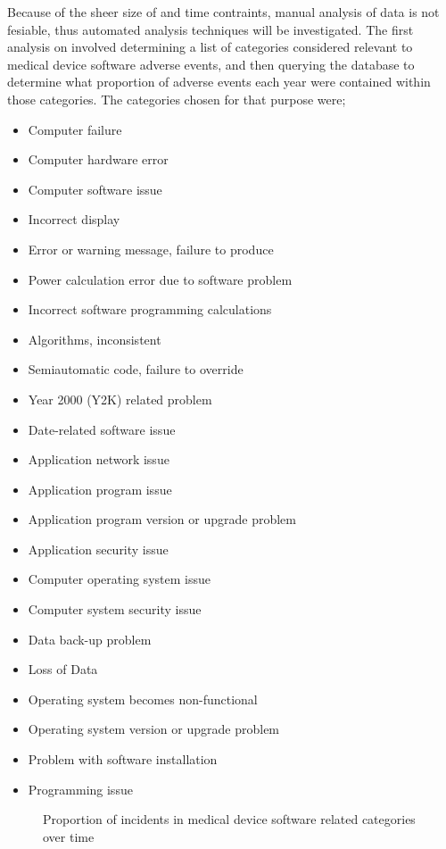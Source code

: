 \documentclass{cshonours}
\begin{document}
Because of the sheer size of \maude and time contraints, manual analysis of data is not fesiable, thus automated analysis techniques will be investigated. The first analysis on \maude involved determining a list of categories considered relevant to medical device software adverse events, and then querying the database to determine what proportion of adverse events each year were contained within those categories. The categories chosen for that purpose were;
\begin{multicols}{2}
{\smaller
\begin{itemize}
  \item Computer failure
  \item Computer hardware error
  \item Computer software issue
  \item Incorrect display
  \item Error or warning message, failure to produce
  \item Power calculation error due to software problem
  \item Incorrect software programming calculations
  \item Algorithms, inconsistent
  \item Semiautomatic code, failure to override
  \item Year 2000 (Y2K) related problem
  \item Date-related software issue
  \item Application network issue
  \item Application program issue
  \item Application program version or upgrade problem
  \item Application security issue
  \item Computer operating system issue
  \item Computer system security issue
  \item Data back-up problem
  \item Loss of Data
  \item Operating system becomes non-functional
  \item Operating system version or upgrade problem
  \item Problem with software installation
  \item Programming issue
\end{itemize}
}
\end{multicols}

\begin{figure}
  \caption{Proportion of incidents in medical device software related categories over time}
  \label{fig:proportiongraph}
\end{figure}
\end{document}
